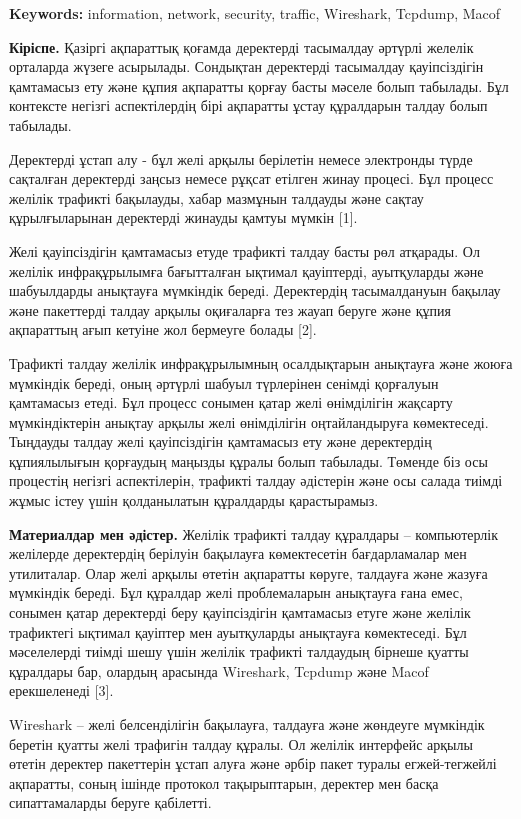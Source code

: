 {\bfseries Keywords:} information, network, security, traffic, Wireshark,
Tcpdump, Macof

{\bfseries Кіріспе.} Қазіргі ақпараттық қоғамда деректерді тасымалдау
әртүрлі желелік орталарда жүзеге асырылады. Сондықтан деректерді
тасымалдау қауіпсіздігін қамтамасыз ету және құпия ақпаратты қорғау
басты мәселе болып табылады. Бұл контексте негізгі аспектілердің бірі
ақпаратты ұстау құралдарын талдау болып табылады.

Деректерді ұстап алу - бұл желі арқылы берілетін немесе электронды түрде
сақталған деректерді заңсыз немесе рұқсат етілген жинау процесі. Бұл
процесс желілік трафикті бақылауды, хабар мазмұнын талдауды және сақтау
құрылғыларынан деректерді жинауды қамтуы мүмкін {[}1{]}.

Желі қауіпсіздігін қамтамасыз етуде трафикті талдау басты рөл атқарады.
Ол желілік инфрақұрылымға бағытталған ықтимал қауіптерді, ауытқуларды
және шабуылдарды анықтауға мүмкіндік береді. Деректердің тасымалдануын
бақылау және пакеттерді талдау арқылы оқиғаларға тез жауап беруге және
құпия ақпараттың ағып кетуіне жол бермеуге болады {[}2{]}.

Трафикті талдау желілік инфрақұрылымның осалдықтарын анықтауға және
жоюға мүмкіндік береді, оның әртүрлі шабуыл түрлерінен сенімді қорғалуын
қамтамасыз етеді. Бұл процесс сонымен қатар желі өнімділігін жақсарту
мүмкіндіктерін анықтау арқылы желі өнімділігін оңтайландыруға
көмектеседі. Тыңдауды талдау желі қауіпсіздігін қамтамасыз ету және
деректердің құпиялылығын қорғаудың маңызды құралы болып табылады.
Төменде біз осы процестің негізгі аспектілерін, трафикті талдау
әдістерін және осы салада тиімді жұмыс істеу үшін қолданылатын
құралдарды қарастырамыз.

{\bfseries Материалдар мен әдістер.} Желілік трафикті талдау құралдары --
компьютерлік желілерде деректердің берілуін бақылауға көмектесетін
бағдарламалар мен утилиталар. Олар желі арқылы өтетін ақпаратты көруге,
талдауға және жазуға мүмкіндік береді. Бұл құралдар желі проблемаларын
анықтауға ғана емес, сонымен қатар деректерді беру қауіпсіздігін
қамтамасыз етуге және желілік трафиктегі ықтимал қауіптер мен
ауытқуларды анықтауға көмектеседі. Бұл мәселелерді тиімді шешу үшін
желілік трафикті талдаудың бірнеше қуатты құралдары бар, олардың
арасында Wireshark, Tcpdump және Macof ерекшеленеді {[}3{]}.

Wireshark -- желі белсенділігін бақылауға, талдауға және жөндеуге
мүмкіндік беретін қуатты желі трафигін талдау құралы. Ол желілік
интерфейс арқылы өтетін деректер пакеттерін ұстап алуға және әрбір пакет
туралы егжей-тегжейлі ақпаратты, соның ішінде протокол тақырыптарын,
деректер мен басқа сипаттамаларды беруге қабілетті.

